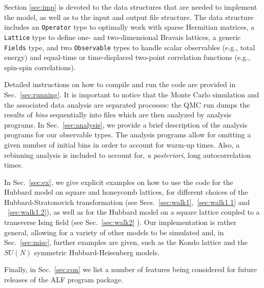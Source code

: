 Section \ref{sec:imp} is devoted to the data structures that are needed to implement the model, as well as to the input and output file structure.   
The data structure includes an \texttt{Operator} type to optimally work with sparse Hermitian matrices, a \texttt{Lattice} type  to define one- and two-dimensional Bravais lattices, a generic \texttt{Fields} type, and two \texttt{Observable} types to handle scalar observables (e.g., total energy) and equal-time or time-displaced two-point correlation functions (e.g., spin-spin correlations).

Detailed instructions on how to compile and run the code are provided in Sec.~\ref{sec:running}.
It is important to notice that the Monte Carlo simulation and the associated data analysis are separated processes: the QMC run dumps the results of \emph{bins} sequentially into files which are then analyzed by analysis programs. In Sec.~\ref{sec:analysis}, we provide a brief description of the analysis programs for our observable types. The analysis programs allow for omitting a given number of initial bins in order to account for warm-up times. Also, a rebinning analysis is included  to account for, \emph{a posteriori}, long autocorrelation times.

In Sec.~\ref{sec:ex}, we  give explicit examples on how to use the code for  the  Hubbard model on square and honeycomb lattices,  for different choices of the Hubbard-Stratonovich transformation  (see Secs.~\ref{sec:walk1},~\ref{sec:walk1.1} and ~\ref{sec:walk1.2}), as well as for the Hubbard model on a square lattice coupled to a transverse Ising field (see Sec.~\ref{sec:walk2} ).   Our implementation is rather general, allowing for a variety of other models to be simulated and, in Sec.~\ref{sec:misc}, further examples are given, such as the Kondo lattice and the $SU(N)$ symmetric Hubbard-Heisenberg models.

Finally, in Sec.~\ref{sec:con} we list a number of features being considered for  future releases of the ALF program package.
